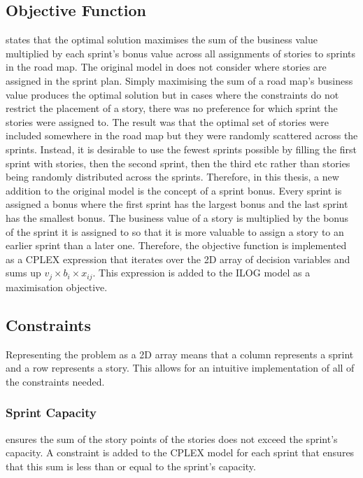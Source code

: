 \subsection{Objective Function}
 states that the optimal solution maximises the sum of the business value multiplied by each sprint's bonus value across all assignments of stories to sprints in the road map. The original model in \citet{golfarelli2012sprint} does not consider where stories are assigned in the sprint plan. Simply maximising the sum of a road map's business value produces the optimal solution but in cases where the constraints do not restrict the placement of a story, there was no preference for which sprint the stories were assigned to. The result was that the optimal set of stories were included somewhere in the road map but they were randomly scattered across the sprints. Instead, it is desirable to use the fewest sprints possible by filling the first sprint with stories, then the second sprint, then the third etc rather than stories being randomly distributed across the sprints. Therefore, in this thesis, a new addition to the original model is the concept of a sprint bonus. Every sprint is assigned a bonus where the first sprint has the largest bonus and the last sprint has the smallest bonus. The business value of a story is multiplied by the bonus of the sprint it is assigned to so that it is more valuable to assign a story to an earlier sprint than a later one. Therefore, the objective function is implemented as a CPLEX expression that iterates over the 2D array of decision variables and sums up $v_j \times b_i \times x_{ij}$. This expression is added to the ILOG model as a maximisation objective.

\subsection{Constraints}

Representing the problem as a 2D array means that a column represents a sprint and a row represents a story. This allows for an intuitive implementation of all of the constraints needed.

\subsubsection{Sprint Capacity}
 ensures the sum of the story points of the stories does not exceed the sprint's capacity. A constraint is added to the CPLEX model for each sprint that ensures that this sum is less than or equal to the sprint's capacity.

